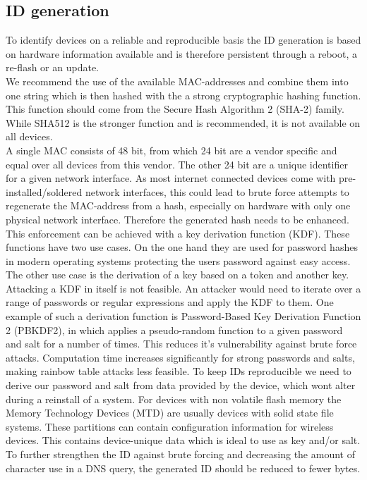     \subsection{ID generation}
        \label{subsec:software_design:id}
        To identify devices on a reliable and reproducible basis the ID generation is based on hardware information available and is therefore persistent through a reboot, a re-flash or an update.\\
        We recommend the use of the available MAC-addresses and combine them into one string which is then hashed with the a strong cryptographic hashing function.
        This function should come from the Secure Hash Algorithm 2 (SHA-2) family. While SHA512 is the stronger function and is recommended, it is not available on all devices.\\
        A single MAC consists of 48 bit, from which 24 bit are a vendor specific and equal over all devices from this vendor. The other 24 bit are a unique identifier for a given network interface. As most internet connected devices come with pre-installed/soldered network interfaces, this could lead to brute force attempts to regenerate the MAC-address from a hash, especially on hardware with only one physical network interface. Therefore the generated hash needs to be enhanced.\\
        This enforcement can be achieved with a key derivation function (KDF). These functions have two use cases. On the one hand they are used for password hashes in modern operating systems protecting the users password against easy access\cite{percival_stronger_nodate}. 
        The other use case is the derivation of a key based on a token and another key\cite{camenisch_privacy_2011}. Attacking a KDF in itself is not feasible. An attacker would need to iterate over a range of passwords or regular expressions and apply the KDF to them\cite{percival_stronger_nodate}.
        One example of such a derivation function is Password-Based Key Derivation Function 2 (PBKDF2), in which applies a pseudo-random function to a given password and salt for a number of times. This reduces it's vulnerability against brute force attacks\cite{kaliski_bkaliskirsasecuritycom_pkcs_2000}. 
        Computation time increases significantly for strong passwords and salts, making rainbow table attacks less feasible. 
        To keep IDs reproducible we need to derive our password and salt from data provided by the device, which wont alter during a reinstall of a system. For devices with non volatile flash memory the Memory Technology Devices (MTD) are usually devices with solid state file systems\cite{giometti_mtd_2017}\cite{woodhouse_memory_nodate}. These partitions can contain configuration information for wireless devices. This contains device-unique data which is ideal to use as key and/or salt.
        To further strengthen the ID against brute forcing and decreasing the amount of character use in a DNS query, the generated ID should be reduced to fewer bytes.\\
        
